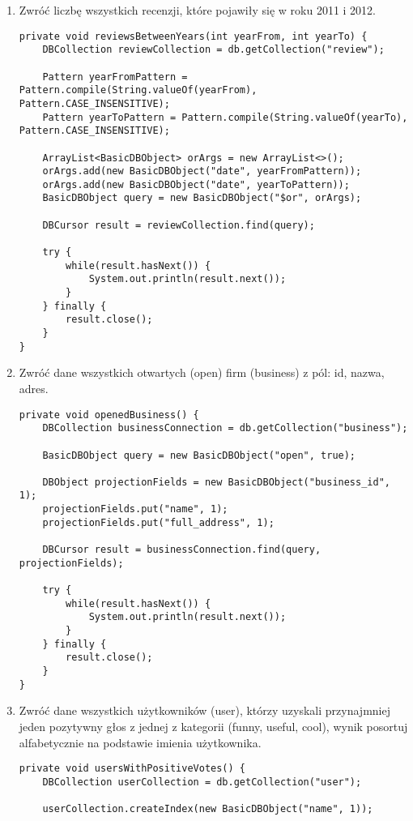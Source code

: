 \documentclass[a4paper,9pt]{extarticle}	%
\begin{document}
\begin{enumerate}
\begin{enumerate}
	  \item Zwróć liczbę wszystkich recenzji, które pojawiły się w roku 2011 i 2012.
	  \begin{lstlisting}
private void reviewsBetweenYears(int yearFrom, int yearTo) {
	DBCollection reviewCollection = db.getCollection("review");

	Pattern yearFromPattern = Pattern.compile(String.valueOf(yearFrom), Pattern.CASE_INSENSITIVE);
	Pattern yearToPattern = Pattern.compile(String.valueOf(yearTo), Pattern.CASE_INSENSITIVE);

	ArrayList<BasicDBObject> orArgs = new ArrayList<>();
	orArgs.add(new BasicDBObject("date", yearFromPattern));
	orArgs.add(new BasicDBObject("date", yearToPattern));
	BasicDBObject query = new BasicDBObject("$or", orArgs);

	DBCursor result = reviewCollection.find(query);

	try {
		while(result.hasNext()) {
			System.out.println(result.next());
		}
	} finally {
		result.close();
	}
}
	  \end{lstlisting}
	  
	  \item Zwróć dane wszystkich otwartych (open) firm (business) z pól: id, nazwa, adres.
	  \begin{lstlisting}
private void openedBusiness() {
	DBCollection businessConnection = db.getCollection("business");

	BasicDBObject query = new BasicDBObject("open", true);

	DBObject projectionFields = new BasicDBObject("business_id", 1);
	projectionFields.put("name", 1);
	projectionFields.put("full_address", 1);

	DBCursor result = businessConnection.find(query, projectionFields);

	try {
		while(result.hasNext()) {
			System.out.println(result.next());
		}
	} finally {
		result.close();
	}
}
	  \end{lstlisting}
	  
	  \item Zwróć dane wszystkich użytkowników (user), którzy uzyskali przynajmniej jeden pozytywny głos z jednej z kategorii (funny, useful, cool), wynik posortuj alfabetycznie na podstawie imienia użytkownika.
	  \begin{lstlisting}
private void usersWithPositiveVotes() {
	DBCollection userCollection = db.getCollection("user");

	userCollection.createIndex(new BasicDBObject("name", 1));


\end{lstlisting}
\end{enumerate}
\end{enumerate}
\end{document}
